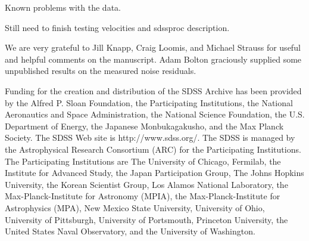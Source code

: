 \documentclass[12pt,preprint]{aastex}
\begin{document}
Known problems with the data.

Still need to finish testing velocities and sdssproc description.

\bigskip
We are very grateful to Jill Knapp, Craig Loomis, and Michael Strauss for
useful and helpful comments on the manuscript.  Adam Bolton 
graciously supplied some unpublished results on the measured noise residuals.

Funding for the creation and distribution of the SDSS Archive has been
provided by the Alfred P. Sloan Foundation, the Participating
Institutions, the National Aeronautics and Space Administration, the
National Science Foundation, the U.S. Department of Energy, the
Japanese Monbukagakusho, and the Max Planck Society. The SDSS Web site
is http://www.sdss.org/. The SDSS is managed by the Astrophysical
Research Consortium (ARC) for the Participating Institutions. The
Participating Institutions are The University of Chicago, Fermilab,
the Institute for Advanced Study, the Japan Participation Group,
The Johns Hopkins University, the Korean Scientist Group, Los Alamos
National Laboratory, the Max-Planck-Institute for Astronomy (MPIA),
the Max-Planck-Institute for Astrophysics (MPA), New Mexico State
University, University of Ohio, University of Pittsburgh,
University of Portsmouth,
Princeton University, the United States Naval Observatory, and
the University of Washington.

\newpage



\end{document}
